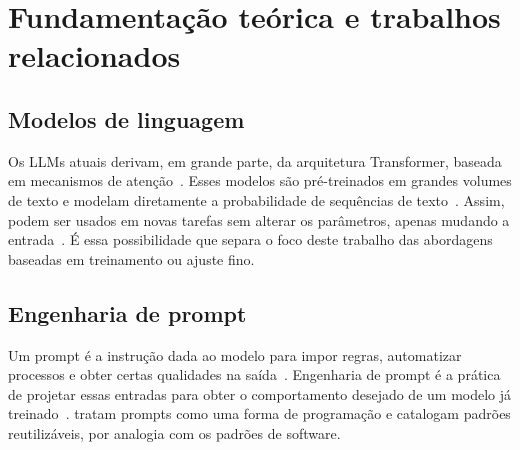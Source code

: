 \section{Fundamentação teórica e trabalhos relacionados}\label{sec:fundamentacao}
\subsection{Modelos de linguagem}
Os LLMs atuais derivam, em grande parte, da arquitetura Transformer, baseada em mecanismos de
atenção~\citep{vaswani2017attention}. Esses modelos são pré-treinados em grandes volumes de texto e
modelam diretamente a probabilidade de sequências de texto~\citep{liu2021pretrain}. Assim, podem
ser usados em novas tarefas sem alterar os parâmetros, apenas mudando a entrada~\citep{sahoo2024survey}.
É essa possibilidade que separa o foco deste trabalho das abordagens baseadas em treinamento ou ajuste fino.

\subsection{Engenharia de prompt}
Um prompt é a instrução dada ao modelo para impor regras, automatizar processos e obter certas
qualidades na saída~\citep{white2023patterns}. Engenharia de prompt é a prática de projetar essas
entradas para obter o comportamento desejado de um modelo já treinado~\citep{sahoo2024survey}.
 tratam prompts como uma forma de programação e catalogam
padrões reutilizáveis, por analogia com os padrões de software.

